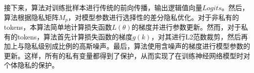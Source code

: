 接下来，算法对训练批样本进行传统的前向传播，输出逻辑值向量$Logits$。然后，算法根据隐私矩阵$M_p$，对模型参数进行选择性的差分隐私优化。对于非私有的tokens，本算法简单地计算损失函数$L(\theta)$的梯度并进行参数更新。然而，对于私有的tokens，算法首先计算损失函数的梯度$g(k)$，对其进行L2范数裁剪，然后再加上与隐私级别成比例的高斯噪声。最后，算法使用含噪声的梯度进行模型参数的更新。这样，所有的私有变量都得到了保护，从而实现了在训练神经网络模型时对个体隐私的保护。



%	
%	
%		
%		
%			
%			
%			
%			
%
%
%
%			
%		
%				
%
%
%	

